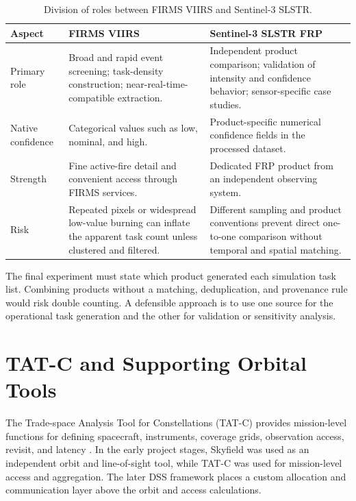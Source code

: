 \begin{table}[H]
\centering
\caption{Division of roles between FIRMS VIIRS and Sentinel-3 SLSTR.}
\label{tab:data_roles}
\begin{tabularx}{\textwidth}{p{}Y Y}
\toprule
Aspect & FIRMS VIIRS & Sentinel-3 SLSTR FRP \\
\midrule
Primary role & Broad and rapid event screening; task-density construction; near-real-time-compatible extraction. & Independent product comparison; validation of intensity and confidence behavior; sensor-specific case studies. \\
Native confidence & Categorical values such as low, nominal, and high. & Product-specific numerical confidence fields in the processed dataset. \\
Strength & Fine active-fire detail and convenient access through FIRMS services. & Dedicated FRP product from an independent observing system. \\
Risk & Repeated pixels or widespread low-value burning can inflate the apparent task count unless clustered and filtered. & Different sampling and product conventions prevent direct one-to-one comparison without temporal and spatial matching. \\
\bottomrule
\end{tabularx}
\end{table}

The final experiment must state which product generated each simulation task list. Combining products without a matching, deduplication, and provenance rule would risk double counting. A defensible approach is to use one source for the operational task generation and the other for validation or sensitivity analysis.

\section{TAT-C and Supporting Orbital Tools}

The Trade-space Analysis Tool for Constellations (TAT-C) provides mission-level functions for defining spacecraft, instruments, coverage grids, observation access, revisit, and latency \citep{TATC}. In the early project stages, Skyfield was used as an independent orbit and line-of-sight tool, while TAT-C was used for mission-level access and aggregation. The later DSS framework places a custom allocation and communication layer above the orbit and access calculations.

